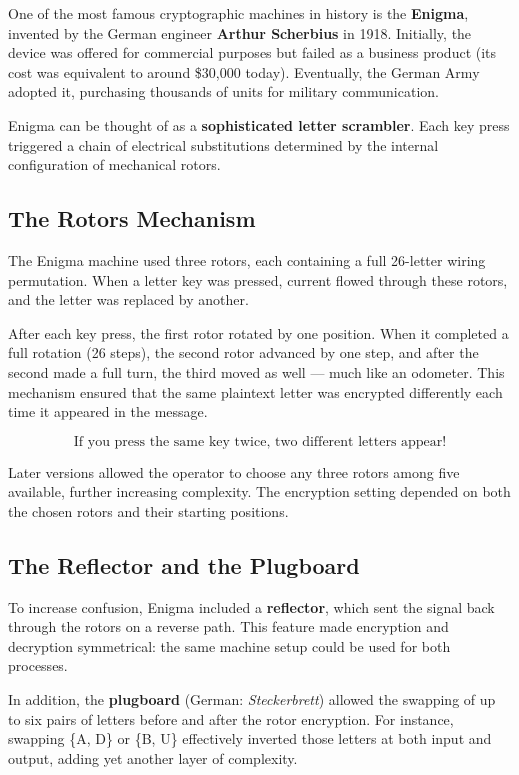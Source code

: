 One of the most famous cryptographic machines in history is the \textbf{Enigma}, invented by the German engineer \textbf{Arthur Scherbius} in 1918.  
Initially, the device was offered for commercial purposes but failed as a business product (its cost was equivalent to around \$30,000 today).  
Eventually, the German Army adopted it, purchasing thousands of units for military communication.

Enigma can be thought of as a \textbf{sophisticated letter scrambler}. Each key press triggered a chain of electrical substitutions determined by the internal configuration of mechanical rotors.

\subsection{The Rotors Mechanism}

The Enigma machine used three rotors, each containing a full 26-letter wiring permutation.  
When a letter key was pressed, current flowed through these rotors, and the letter was replaced by another.

After each key press, the first rotor rotated by one position.  
When it completed a full rotation (26 steps), the second rotor advanced by one step, and after the second made a full turn, the third moved as well — much like an odometer.  
This mechanism ensured that the same plaintext letter was encrypted differently each time it appeared in the message.

\[
\text{If you press the same key twice, two different letters appear!}
\]

Later versions allowed the operator to choose any three rotors among five available, further increasing complexity.  
The encryption setting depended on both the chosen rotors and their starting positions.

\subsection{The Reflector and the Plugboard}

To increase confusion, Enigma included a \textbf{reflector}, which sent the signal back through the rotors on a reverse path.  
This feature made encryption and decryption symmetrical: the same machine setup could be used for both processes.

In addition, the \textbf{plugboard} (German: \emph{Steckerbrett}) allowed the swapping of up to six pairs of letters before and after the rotor encryption.  
For instance, swapping \{A, D\} or \{B, U\} effectively inverted those letters at both input and output, adding yet another layer of complexity.

